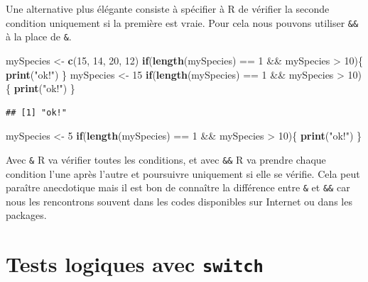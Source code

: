 \documentclass[twoside,symmetric]{book}
\newenvironment{Shaded}{}{}
\newcommand{\ControlFlowTok}[1]{\textbf{#1}}
\newcommand{\DecValTok}[1]{#1}
\newcommand{\KeywordTok}[1]{\textbf{#1}}
\newcommand{\NormalTok}[1]{#1}
\newcommand{\OperatorTok}[1]{#1}
\newcommand{\StringTok}[1]{#1}
\begin{document}
Une alternative plus élégante consiste à spécifier à R de vérifier la seconde condition uniquement si la première est vraie. Pour cela nous pouvons utiliser \texttt{\&\&} à la place de \texttt{\&}.

\begin{Shaded}
\begin{Highlighting}[]
\NormalTok{mySpecies <-}\StringTok{ }\KeywordTok{c}\NormalTok{(}\DecValTok{15}\NormalTok{, }\DecValTok{14}\NormalTok{, }\DecValTok{20}\NormalTok{, }\DecValTok{12}\NormalTok{)}
\ControlFlowTok{if}\NormalTok{(}\KeywordTok{length}\NormalTok{(mySpecies) }\OperatorTok{==}\StringTok{ }\DecValTok{1} \OperatorTok{&&}\StringTok{ }\NormalTok{mySpecies }\OperatorTok{>}\StringTok{ }\DecValTok{10}\NormalTok{)\{}
  \KeywordTok{print}\NormalTok{(}\StringTok{"ok!"}\NormalTok{)}
\NormalTok{\}}
\NormalTok{mySpecies <-}\StringTok{ }\DecValTok{15}
\ControlFlowTok{if}\NormalTok{(}\KeywordTok{length}\NormalTok{(mySpecies) }\OperatorTok{==}\StringTok{ }\DecValTok{1} \OperatorTok{&&}\StringTok{ }\NormalTok{mySpecies }\OperatorTok{>}\StringTok{ }\DecValTok{10}\NormalTok{)\{}
  \KeywordTok{print}\NormalTok{(}\StringTok{"ok!"}\NormalTok{)}
\NormalTok{\}}
\end{Highlighting}
\end{Shaded}

\begin{verbatim}
## [1] "ok!"
\end{verbatim}

\begin{Shaded}
\begin{Highlighting}[]
\NormalTok{mySpecies <-}\StringTok{ }\DecValTok{5}
\ControlFlowTok{if}\NormalTok{(}\KeywordTok{length}\NormalTok{(mySpecies) }\OperatorTok{==}\StringTok{ }\DecValTok{1} \OperatorTok{&&}\StringTok{ }\NormalTok{mySpecies }\OperatorTok{>}\StringTok{ }\DecValTok{10}\NormalTok{)\{}
  \KeywordTok{print}\NormalTok{(}\StringTok{"ok!"}\NormalTok{)}
\NormalTok{\}}
\end{Highlighting}
\end{Shaded}

Avec \texttt{\&} R va vérifier toutes les conditions, et avec \texttt{\&\&} R va prendre chaque condition l'une après l'autre et poursuivre uniquement si elle se vérifie. Cela peut paraître anecdotique mais il est bon de connaître la différence entre \texttt{\&} et \texttt{\&\&} car nous les rencontrons souvent dans les codes disponibles sur Internet ou dans les packages.

\hypertarget{l17switch}{%
\section{\texorpdfstring{Tests logiques avec \texttt{switch}}{Tests logiques avec switch}}\label{l17switch}}
\end{document}
